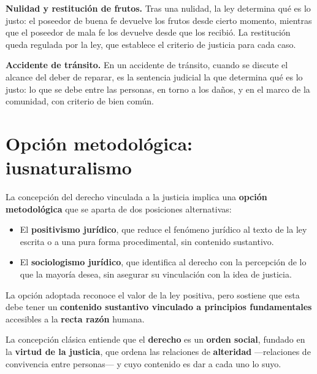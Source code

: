 \documentclass[12pt, a4paper]{report}
\begin{document}
\begin{example}
\textbf{Nulidad y restitución de frutos.} Tras una nulidad, la ley determina
qué es lo justo: el poseedor de buena fe devuelve los frutos desde cierto
momento, mientras que el poseedor de mala fe los devuelve desde que los
recibió. La restitución queda regulada por la ley, que establece el criterio
de justicia para cada caso.
\end{example}

\begin{example}
\textbf{Accidente de tránsito.} En un accidente de tránsito, cuando se discute
el alcance del deber de reparar, es la sentencia judicial la que determina qué
es lo justo: lo que se debe entre las personas, en torno a los daños, y en el
marco de la comunidad, con criterio de bien común.
\end{example}

\section{Opción metodológica: iusnaturalismo}

La concepción del derecho vinculada a la justicia implica una \textbf{opción
metodológica} que se aparta de dos posiciones alternativas:

\begin{itemize}
  \item El \textbf{positivismo jurídico}, que reduce el fenómeno jurídico al
        texto de la ley escrita o a una pura forma procedimental, sin contenido
        sustantivo.
  \item El \textbf{sociologismo jurídico}, que identifica al derecho con la
        percepción de lo que la mayoría desea, sin asegurar su vinculación con
        la idea de justicia.
\end{itemize}

La opción adoptada reconoce el valor de la ley positiva, pero sostiene que esta
debe tener un \textbf{contenido sustantivo vinculado a principios fundamentales}
accesibles a la \textbf{recta razón} humana.

\begin{definition}
La concepción clásica entiende que el \textbf{derecho} es un
\textbf{orden social}, fundado en la \textbf{virtud de la justicia}, que
ordena las relaciones de \textbf{alteridad} ---relaciones de convivencia entre
personas--- y cuyo contenido es dar a cada uno lo suyo.
\end{definition}
\end{document}
